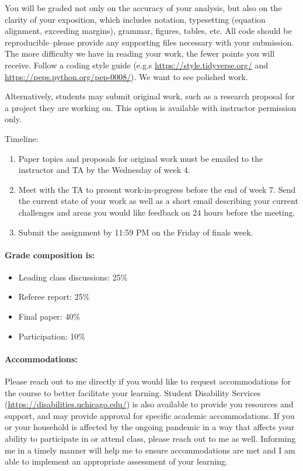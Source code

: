 \documentclass[letterpaper, 12pt, parskip=full,DIV=10]{scrartcl}
\begin{document}
You will be graded not only on the accuracy of your analysis, but also on the clarity of your exposition, which includes notation, typesetting (equation alignment, exceeding margins), grammar, figures, tables, etc. All code should be reproducible--please provide any supporting files necessary with your submission. 
The more difficulty we have in reading your work, the fewer points you will receive. Follow a coding style guide  (e.g.s \url{https://style.tidyverse.org/} and \url{https://peps.python.org/pep-0008/}). We want to see polished work.

Alternatively, students may submit original work, such as a research proposal for a project they are working on. This option is available with instructor permission only.

Timeline:
\begin{enumerate}
\item Paper topics and proposals for original work must be emailed to the instructor and TA by the Wednesday of week 4.  
\item Meet with the TA to present work-in-progress before the end of week 7. Send the current state of your work as well as a short email describing your current challenges and areas you would like feedback on 24 hours before the meeting. 
\item Submit the assignment by 11:59 PM on the Friday of finals week.
\end{enumerate}

\paragraph{Grade composition is:}

\begin{itemize}[topsep=0pt,itemsep=-1ex,partopsep=1ex,parsep=1ex]
\item Leading class discussions: 25\% 
\item Referee report: 25\%
\item Final paper: 40\%
\item Participation: 10\%
\end{itemize}

\paragraph{Accommodations:} Please reach out to me directly if you would like to request accommodations for the course to better facilitate your learning. Student Disability Services (\url{https://disabilities.uchicago.edu/}) is also available to provide you resources and support, and may provide approval for specific academic accommodations. If you or your household is affected by the ongoing pandemic in a way that affects your ability to participate in or attend class, please reach out to me as well. Informing me in a timely manner will help me to ensure accommodations are met and I am able to implement an appropriate assessment of your learning. 
\end{document}

